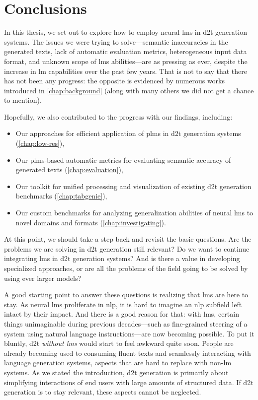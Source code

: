 
\chapter{Conclusions}
\label{chap:conclusions}

In this thesis, we set out to explore how to employ neural \acp{lm} in \ac{d2t} generation systems. The issues we were trying to solve---semantic inaccuracies in the generated texts, lack of automatic evaluation metrics, heterogeneous input data format, and unknown scope of \acp{lm} abilities---are as pressing as ever, despite the increase in \ac{lm} capabilities over the past few years. That is not to say that there has not been any progress: the opposite is evidenced by numerous works introduced in \autoref{chap:background} (along with many others we did not get a chance to mention).


Hopefully, we also contributed to the progress with our findings, including:
\begin{itemize}
    \item Our approaches for efficient application of \acp{plm} in \ac{d2t} generation systems (\autoref{chap:low-res}),
    \item Our \acp{plm}-based automatic metrics for evaluating semantic accuracy of generated texts (\autoref{chap:evaluation}),
    \item Our toolkit for unified processing and visualization of existing \ac{d2t} generation benchmarks (\autoref{chap:tabgenie}),
    \item Our custom benchmarks for analyzing generalization abilities of neural \acp{lm} to novel domains and formats (\autoref{chap:investigating}).
\end{itemize}

At this point, we should take a step back and revisit the basic questions. Are the problems we are solving in \ac{d2t} generation still relevant? Do we want to continue integrating \acp{lm} in \ac{d2t} generation systems? And is there a value in developing specialized approaches, or are all the problems of the field going to be solved by using ever larger models?

A good starting point to answer these questions is realizing that \acp{lm} are here to stay. As neural \acp{lm} proliferate in \ac{nlp}, it is hard to imagine an \ac{nlp} subfield left intact by their impact. And there is a good reason for that: with \acp{lm}, certain things unimaginable during previous decades---such as fine-grained steering of a system using natural language instructions---are now becoming possible. To put it bluntly, \ac{d2t} \emph{without \acp{lm}} would start to feel awkward quite soon. People are already becoming used to consuming fluent texts and seamlessly interacting with language generation systems, aspects that are hard to replace with non-\ac{lm} systems. As we stated the introduction, \ac{d2t} generation is primarily about simplifying interactions of end users with large amounts of structured data. If \ac{d2t} generation is to stay relevant, these aspects cannot be neglected.

